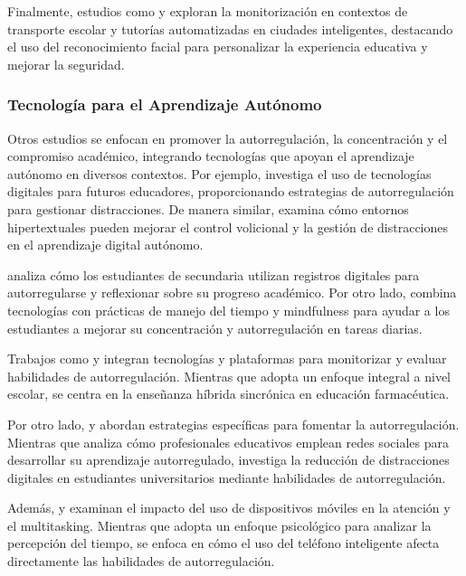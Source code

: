 \documentclass[a4paper,fleqn]{cas-sc}
\begin{document}
				Finalmente, estudios como \cite{Boumiza2017} y \cite{DaCosta2023} exploran la monitorización en contextos de transporte escolar y tutorías automatizadas en ciudades inteligentes, destacando el uso del reconocimiento facial para personalizar la experiencia educativa y mejorar la seguridad.
				
			\subsubsection{Tecnología para el Aprendizaje Autónomo}
				Otros estudios se enfocan en promover la autorregulación, la concentración y el compromiso académico, integrando tecnologías que apoyan el aprendizaje autónomo en diversos contextos. Por ejemplo, \cite{Bembich2016Future} investiga el uso de tecnologías digitales para futuros educadores, proporcionando estrategias de autorregulación para gestionar distracciones. De manera similar, \cite{Peters2003Self} examina cómo entornos hipertextuales pueden mejorar el control volicional y la gestión de distracciones en el aprendizaje digital autónomo.
				
				\cite{Roberts2020Task} analiza cómo los estudiantes de secundaria utilizan registros digitales para autorregularse y reflexionar sobre su progreso académico. Por otro lado, \cite{Adcroft2018Developing} combina tecnologías con prácticas de manejo del tiempo y mindfulness para ayudar a los estudiantes a mejorar su concentración y autorregulación en tareas diarias.
				
				Trabajos como \cite{Salter2014Exploring} y \cite{Palmer2022impact} integran tecnologías y plataformas para monitorizar y evaluar habilidades de autorregulación. Mientras que \cite{Salter2014Exploring} adopta un enfoque integral a nivel escolar, \cite{Palmer2022impact} se centra en la enseñanza híbrida sincrónica en educación farmacéutica.
				
				Por otro lado, \cite{Muljana2022Instructional} y \cite{Wang2022Empowering} abordan estrategias específicas para fomentar la autorregulación. Mientras que \cite{Muljana2022Instructional} analiza cómo profesionales educativos emplean redes sociales para desarrollar su aprendizaje autorregulado, \cite{Wang2022Empowering} investiga la reducción de distracciones digitales en estudiantes universitarios mediante habilidades de autorregulación.
				
				Además, \cite{Hartley2022Smartphone} y \cite{Labar2019Interplay} examinan el impacto del uso de dispositivos móviles en la atención y el multitasking. Mientras que \cite{Labar2019Interplay} adopta un enfoque psicológico para analizar la percepción del tiempo, \cite{Hartley2022Smartphone} se enfoca en cómo el uso del teléfono inteligente afecta directamente las habilidades de autorregulación.
				
\end{document}
